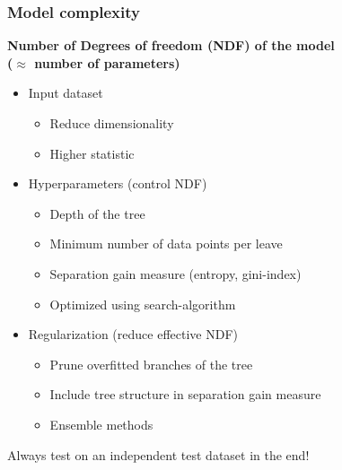 \begin{frame}
    \frametitle{Model complexity}
    \begin{center}

      \textbf{Number of Degrees of freedom (NDF) of the model \\($\approx$ number of parameters)}
      \begin{itemize}
        \item Input dataset
        \begin{itemize}
          \item Reduce dimensionality
          \item Higher statistic
        \end{itemize}
        \item Hyperparameters (control NDF)
        \begin{itemize}
          \item Depth of the tree
          \item Minimum number of data points per leave
          \item Separation gain measure (entropy, gini-index)
          \item Optimized using search-algorithm
        \end{itemize}
        \item Regularization (reduce effective NDF)
        \begin{itemize}
          \item Prune overfitted branches of the tree
          \item Include tree structure in separation gain measure
          \item Ensemble methods
        \end{itemize}
      \end{itemize}

      \large{Always test on an independent test dataset in the end!}
    \end{center}
\end{frame}

